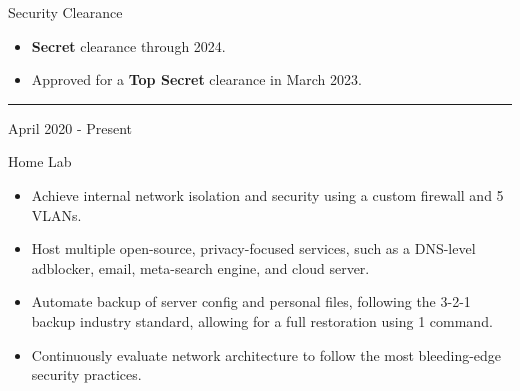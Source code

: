 \documentclass[a4paper]{article}
\newlength{\cvcolumngapwidth}
\newlength{\cvleftcolumnwidth}
\newlength{\cvrightcolumnwidth}
\newcommand{\cvsectionstyle}[1]{{\normalsize\cvsectionfont\textcolor{cvsectioncolor}{#1}}}
\newcommand{\cvtitlestyle}[1]{{\large\cvtitlefont\textcolor{cvtitlecolor}{#1}}}
\newcommand{\cvdurationstyle}[1]{{\small\cvdurationfont\textcolor{cvdurationcolor}{#1}}}
\newcommand{\cvheadingstyle}[1]{{\normalsize\cvheadingfont\textcolor{cvheadingcolor}{#1}}}
\newlength{\cvafteritemskipamount}
\newlength{\cvaftersectionskipamount}
\newlength{\cvaftertitleskipamount}
\newlength{\cvparskip}
\newcommand{\cvsection}[1]{
    \begin{minipage}[t]{\cvleftcolumnwidth}
        \raggedleft\cvsectionstyle{#1}
    \end{minipage}%
    \hspace{\cvcolumngapwidth}%
    \begin{minipage}[t]{\cvrightcolumnwidth}
        \textcolor{cvrulecolor}{\rule{\cvrightcolumnwidth}{0.3mm}}
    \end{minipage}

    \vspace{\cvaftersectionskipamount}
}
\newcommand{\cvitem}[2]{
    \begin{minipage}[t]{\cvleftcolumnwidth}
        \raggedleft #1
    \end{minipage}%
    \hspace{\cvcolumngapwidth}%
    \begin{minipage}[t]{\cvrightcolumnwidth}
        \setlength{\parskip}{\cvparskip} #2
    \end{minipage}

    \vspace{\cvafteritemskipamount}
}
\newcommand{\cvtitle}[1]{
    \cvtitlestyle{#1}

    \vspace{\cvaftertitleskipamount}
    \vspace{-\cvparskip}
}
\begin{document}
\cvitem{
    \cvheadingstyle{Security Clearance}
}{
    \begin{itemize}[leftmargin=*]
      \item \textbf{Secret} clearance through 2024.
      \item Approved for a \textbf{Top Secret} clearance in March 2023.
    \end{itemize}
    \vspace{5mm}
}


\cvsection{\LARGE \textcolor{emphasiscolor}{PERSONAL PROJECTS}}
\vspace{5mm}

\cvitem{
    \cvdurationstyle{April 2020 - Present}
}{
  \cvtitle{Home Lab}

    \begin{itemize}[leftmargin=*]
        \item Achieve internal network isolation and security using a custom firewall and 5 VLANs.
        \item Host multiple open-source, privacy-focused services, such as a DNS-level adblocker, email, meta-search engine, and cloud server.
        \item Automate backup of server config and personal files, following the 3-2-1 backup industry standard, allowing for a full restoration using 1 command.
        \item Continuously evaluate network architecture to follow the most bleeding-edge security practices.
    \end{itemize}
}
\end{document}
